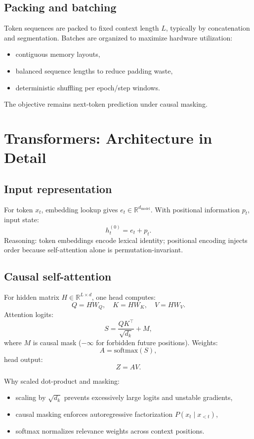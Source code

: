 \documentclass[12pt]{article}
\begin{document}
\subsection{Packing and batching}

Token sequences are packed to fixed context length \(L\), typically by concatenation and segmentation. Batches are organized to maximize hardware utilization:
\begin{itemize}
    \item contiguous memory layouts,
    \item balanced sequence lengths to reduce padding waste,
    \item deterministic shuffling per epoch/step windows.
\end{itemize}
The objective remains next-token prediction under causal masking.

\section{Transformers: Architecture in Detail}

\subsection{Input representation}

For token \(x_t\), embedding lookup gives \(e_t\in\mathbb{R}^{d_{\text{model}}}\). With positional information \(p_t\), input state:
\[
h_t^{(0)} = e_t + p_t.
\]
Reasoning: token embeddings encode lexical identity; positional encoding injects order because self-attention alone is permutation-invariant.

\subsection{Causal self-attention}

For hidden matrix \(H\in\mathbb{R}^{L\times d}\), one head computes:
\[
Q = H W_Q,\quad K = H W_K,\quad V = H W_V.
\]
Attention logits:
\[
S = \frac{QK^\top}{\sqrt{d_k}} + M,
\]
where \(M\) is causal mask (\(-\infty\) for forbidden future positions). Weights:
\[
A = \text{softmax}(S),
\]
head output:
\[
Z = AV.
\]

Why scaled dot-product and masking:
\begin{itemize}
    \item scaling by \(\sqrt{d_k}\) prevents excessively large logits and unstable gradients,
    \item causal masking enforces autoregressive factorization \(P(x_t\mid x_{<t})\),
    \item softmax normalizes relevance weights across context positions.
\end{itemize}
\end{document}
